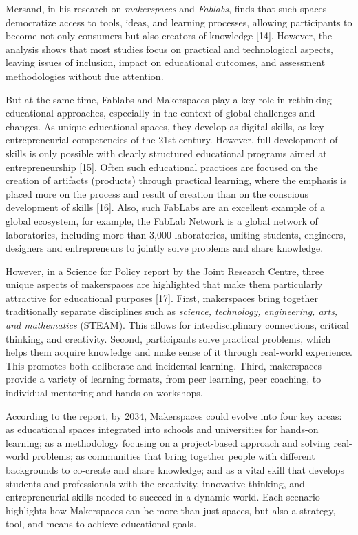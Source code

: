 Mersand, in his research on \emph{makerspaces} and \emph{Fablabs}, finds
that such spaces democratize access to tools, ideas, and learning
processes, allowing participants to become not only consumers but also
creators of knowledge {[}14{]}. However, the analysis shows that most
studies focus on practical and technological aspects, leaving issues of
inclusion, impact on educational outcomes, and assessment methodologies
without due attention.

But at the same time, Fablabs and Makerspaces play a key role in
rethinking educational approaches, especially in the context of global
challenges and changes. As unique educational spaces, they develop as
digital skills, as key entrepreneurial competencies of the 21st century.
However, full development of skills is only possible with clearly
structured educational programs aimed at entrepreneurship {[}15{]}.
Often such educational practices are focused on the creation of
artifacts (products) through practical learning, where the emphasis is
placed more on the process and result of creation than on the conscious
development of skills {[}16{]}. Also, such FabLabs are an excellent
example of a global ecosystem, for example, the FabLab Network is a
global network of laboratories, including more than 3,000 laboratories,
uniting students, engineers, designers and entrepreneurs to jointly
solve problems and share knowledge.

However, in a Science for Policy report by the Joint Research Centre,
three unique aspects of makerspaces are highlighted that make them
particularly attractive for educational purposes {[}17{]}. First,
makerspaces bring together traditionally separate disciplines such as
\emph{science, technology, engineering, arts, and mathematics} (STEAM).
This allows for interdisciplinary connections, critical thinking, and
creativity. Second, participants solve practical problems, which helps
them acquire knowledge and make sense of it through real-world
experience. This promotes both deliberate and incidental learning.
Third, makerspaces provide a variety of learning formats, from peer
learning, peer coaching, to individual mentoring and hands-on workshops.

According to the report, by 2034, Makerspaces could evolve into four key
areas: as educational spaces integrated into schools and universities
for hands-on learning; as a methodology focusing on a project-based
approach and solving real-world problems; as communities that bring
together people with different backgrounds to co-create and share
knowledge; and as a vital skill that develops students and professionals
with the creativity, innovative thinking, and entrepreneurial skills
needed to succeed in a dynamic world. Each scenario highlights how
Makerspaces can be more than just spaces, but also a strategy, tool, and
means to achieve educational goals.

